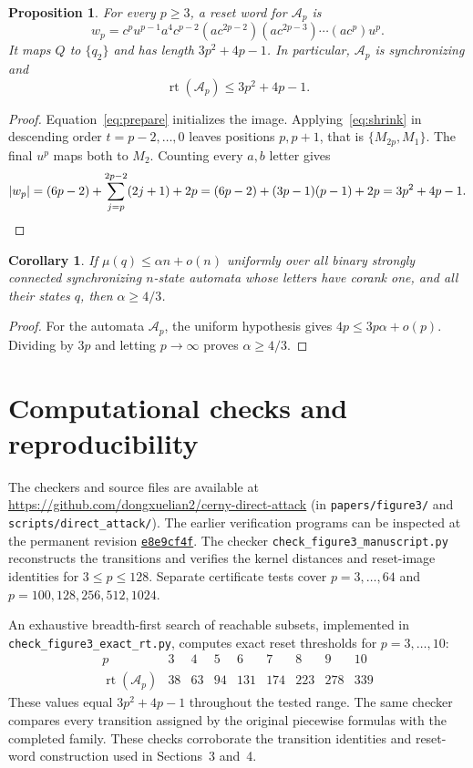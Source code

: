 \documentclass[11pt]{article}
\newtheorem{proposition}[theorem]{Proposition}
\newtheorem{corollary}[theorem]{Corollary}
\newcommand{\M}[1]{M_{#1}}
\newcommand{\pair}[2]{\{#1,#2\}}
\begin{document}
\begin{proposition}\label{prop:sync}
For every $p\geq3$, a reset word for $\mathcal A_p$ is
\begin{equation}\label{eq:reset}
 w_p=c^p u^{p-1}a^4c^{p-2}
       (ac^{2p-2})(ac^{2p-3})\cdots(ac^p)u^p.
\end{equation}
It maps $Q$ to $\{q_2\}$ and has length $3p^2+4p-1$. In particular, $\mathcal A_p$ is synchronizing and
\[
 \operatorname{rt}(\mathcal A_p)\leq3p^2+4p-1.
\]
\end{proposition}
\begin{proof}
Equation~\eqref{eq:prepare} initializes the image. Applying~\eqref{eq:shrink} in descending order $t=p-2,\ldots,0$ leaves positions $p,p+1$, that is $\pair{\M{2p}}{\M1}$. The final $u^p$ maps both to $\M2$. Counting every $a,b$ letter gives
\[
 |w_p|=(6p-2)+\sum_{j=p}^{2p-2}(2j+1)+2p
       =(6p-2)+(3p-1)(p-1)+2p=3p^2+4p-1.\qedhere
\]
\end{proof}
\begin{corollary}
If $\mu(q)\leq\alpha n+o(n)$ uniformly over all binary strongly connected synchronizing $n$-state automata whose letters have corank one, and all their states $q$, then $\alpha\geq4/3$.
\end{corollary}
\begin{proof}
For the automata $\mathcal A_p$, the uniform hypothesis gives $4p\leq3p\alpha+o(p)$. Dividing by $3p$ and letting $p\to\infty$ proves $\alpha\geq4/3$.
\end{proof}

\section{Computational checks and reproducibility}
The checkers and source files are available at
\url{https://github.com/dongxuelian2/cerny-direct-attack}
(in \texttt{papers/figure3/} and \nolinkurl{scripts/direct_attack/}). The earlier verification programs can be inspected at the permanent revision
\href{https://github.com/dongxuelian2/cerny-direct-attack/tree/e8e9cf4f48fe774c09042110f1e094323370a61c}{\texttt{e8e9cf4f}}.
The checker \nolinkurl{check_figure3_manuscript.py} reconstructs the transitions and verifies the kernel distances and reset-image identities for $3\leq p\leq128$. Separate certificate tests cover $p=3,\ldots,64$ and $p=100,128,256,512,1024$.

An exhaustive breadth-first search of reachable subsets, implemented in \nolinkurl{check_figure3_exact_rt.py}, computes exact reset thresholds for $p=3,\ldots,10$:
\[
\begin{array}{c|rrrrrrrr}
p&3&4&5&6&7&8&9&10\\\hline
\operatorname{rt}(\mathcal A_p)&38&63&94&131&174&223&278&339
\end{array}
\]
These values equal $3p^2+4p-1$ throughout the tested range. The same checker compares every transition assigned by the original piecewise formulas with the completed family. These checks corroborate the transition identities and reset-word construction used in Sections~3 and~4.
\end{document}
